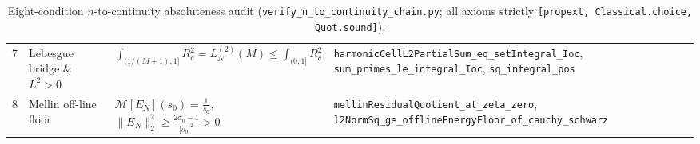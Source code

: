 \documentclass[11pt,a4paper]{article}
\theoremstyle{definition}
\begin{document}
\begin{table}[ht]
\begin{tabular}{@{}cl>{\raggedright\arraybackslash}p{4.3cm}>{\raggedright\arraybackslash}p{7.3cm}@{}}
7 & Lebesgue bridge \& $L^2 > 0$ & $\int_{(1/(M+1),1]} R_c^2 = L_N^{(2)}(M) \le \int_{(0,1]} R_c^2$ & \texttt{harmonicCellL2PartialSum\_\allowbreak eq\_setIntegral\_Ioc}, \texttt{sum\_primes\_le\_\allowbreak integral\_Ioc}, \texttt{sq\_integral\_pos} \\
8 & Mellin off-line floor & $\mathcal{M}[E_N](s_0) = \frac{1}{s_0}$, $\|E_N\|_2^2 \ge \frac{2\sigma_0 - 1}{|s_0|^2} > 0$ & \texttt{mellinResidualQuotient\_\allowbreak at\_zeta\_zero}, \texttt{l2NormSq\_ge\_\allowbreak offlineEnergyFloor\_\allowbreak of\_cauchy\_schwarz} \\
\bottomrule
\end{tabular}
\caption{Eight-condition $n$-to-continuity absoluteness audit (\texttt{verify\_\allowbreak n\_\allowbreak to\_\allowbreak continuity\_\allowbreak chain.py}; all axioms strictly \texttt{[propext, Classical.choice, Quot.sound]}).}
\label{tab:eight_condition_continuity}
\end{table}



\end{document}
